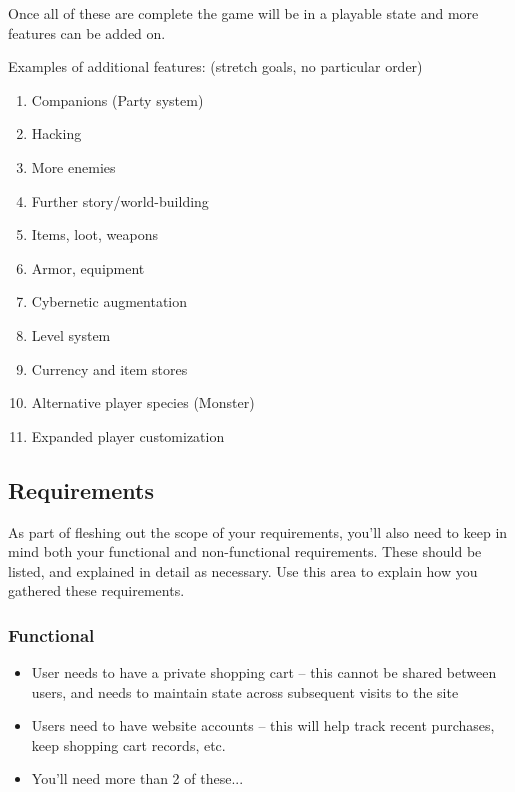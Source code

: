 \documentclass[10pt,conference,onecolumn,compsoc]{IEEEtran}
\begin{document}
Once all of these are complete the game will be in a playable state and more features can be added on.

Examples of additional features: (stretch goals, no particular order)
\begin{enumerate}
\item Companions (Party system)
\item Hacking
\item More enemies
\item Further story/world-building
\item Items, loot, weapons
\item Armor, equipment
\item Cybernetic augmentation
\item Level system
\item Currency and item stores
\item Alternative player species (Monster)
\item Expanded player customization
\end{enumerate}




\pagebreak
\subsection{Requirements}
As part of fleshing out the scope of your requirements, you'll also need to keep in mind both your functional and non-functional requirements.  These should be listed, and explained in detail as necessary.  Use this area to explain how you gathered these requirements.

\subsubsection{Functional}
\begin{itemize}
\item User needs to have a private shopping cart -- this cannot be shared between users, and needs to maintain state across subsequent visits to the site
\item Users need to have website accounts -- this will help track recent purchases, keep shopping cart records, etc.
\item You'll need more than 2 of these...
\end{itemize}
\end{document}
